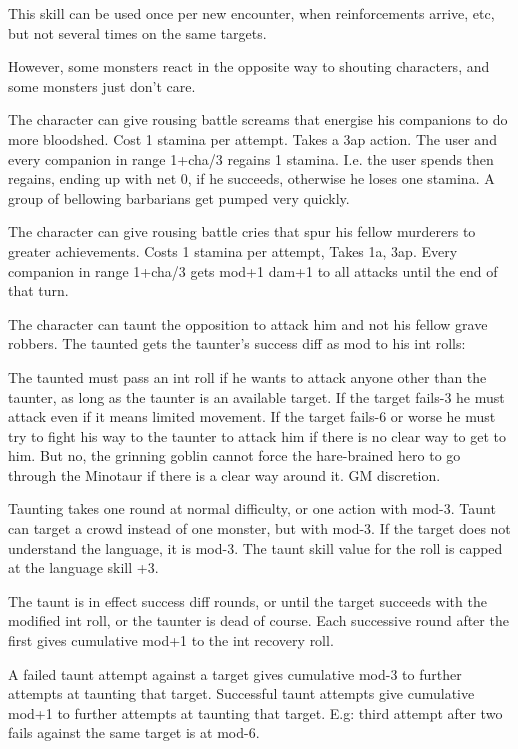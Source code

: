 This skill can be used once per new encounter, when reinforcements arrive, etc, but not several times on the same targets.

However, some monsters react in the opposite way to shouting characters, and some monsters just don't care.


 The character can give rousing battle screams that energise his companions to do more bloodshed.
Cost 1 stamina per attempt. Takes a 3ap action. The user and every companion in range 1+cha/3 regains 1 stamina. I.e. the user spends then regains, ending up with net 0, if he succeeds, otherwise he loses one stamina.
A group of bellowing barbarians get pumped very quickly.


 The character can give rousing battle cries that spur his fellow murderers to greater achievements.
Costs 1 stamina per attempt, Takes 1a, 3ap. Every companion in range 1+cha/3 gets mod+1 dam+1 to all attacks until the end of that turn.


 The character can taunt the opposition to attack him and not his fellow grave robbers. The taunted gets the taunter's success diff as mod to his int rolls:

The taunted must pass an int roll if he wants to attack anyone other than the taunter, as long as the taunter is an available target. If the target fails-3 he must attack even if it means limited movement. If the target fails-6 or worse he must try to fight his way to the taunter to attack him if there is no clear way to get to him. But no, the grinning goblin cannot force the hare-brained hero to go through the Minotaur if there is a clear way around it. GM discretion.

Taunting takes one round at normal difficulty, or one action with mod-3. Taunt can target a crowd instead of one monster, but with mod-3. If the target does not understand the language, it is mod-3. The taunt skill value for the roll is capped at the language skill +3.

The taunt is in effect success diff rounds, or until the target succeeds with the modified int roll, or the taunter is dead of course. Each successive round after the first gives cumulative mod+1 to the int recovery roll.

A failed taunt attempt against a target gives cumulative mod-3 to further attempts at taunting that target. Successful taunt attempts give cumulative mod+1 to further attempts at taunting that target.
E.g: third attempt after two fails against the same target is at mod-6.

